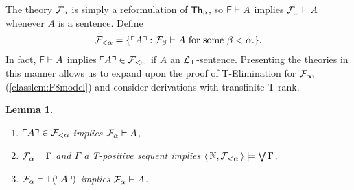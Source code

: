 \documentclass[UKenglish,cleveref,DIV=12]{scrartcl}
\newtheorem{lemma}{Lemma}
\theoremstyle{definition}
\theoremstyle{definition}
\begin{document}
The theory $\mathcal{F}_n$ is simply a reformulation of $\mathsf{Th}_n$, so $\mathsf{F}\vdash A$ implies $\mathcal{F}_\omega\vdash A$ whenever $A$ is a sentence. Define
\begin{align*}
 \mathcal{F}_{<\alpha}=\{\ulcorner{A}\urcorner:\mathcal{F}_\beta\vdash A\text{ for some $\beta<\alpha$.}\}.
\end{align*}
In fact, $\mathsf{F}\vdash A$ implies $\ulcorner{A}\urcorner\in\mathcal{F}_{<\omega}$ if $A$ an $\mathcal{L}_{\mathsf{T}}$-sentence.
Presenting the theories in this manner allows us to expand upon the proof
of T-Elimination for $\mathcal{F}_\infty$ (\cref{classlem:F8model}) and consider derivations
with transfinite T-rank.
\pagebreak[2]
\begin{lemma}\label{extlem:FF1TElim}\
\begin{enumerate}
  \item $\ulcorner{A}\urcorner\in\mathcal{F}_{<\alpha}$ implies $\mathcal{F}_\alpha\vdash A$,
  \item $\mathcal{F}_\alpha\vdash\Gamma$ and $\Gamma$ a T-positive sequent implies
	$\langle\,\mathbb N,\mathcal{F}_{<\alpha}\,\rangle\models\bigvee\Gamma$,
  \item $\mathcal{F}_\alpha\vdash \mathsf{T}(\ulcorner{A}\urcorner)$ implies $\mathcal{F}_\alpha\vdash A$.
\end{enumerate}
\end{lemma}
\end{document}
